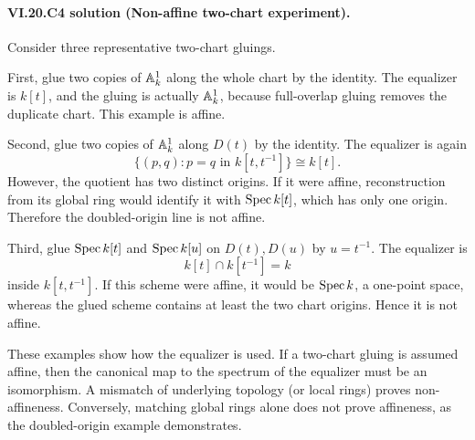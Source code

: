 \paragraph{VI.20.C4 solution (Non-affine two-chart experiment).}
\begin{solution}
Consider three representative two-chart gluings.

First, glue two copies of $\mathbb A^1_k$ along the whole chart by the identity.  The equalizer is $k[t]$, and the gluing is actually $\mathbb A^1_k$, because full-overlap gluing removes the duplicate chart.  This example is affine.

Second, glue two copies of $\mathbb A^1_k$ along $D(t)$ by the identity.  The equalizer is again
\[
\{(p,q):p=q\text{ in }k[t,t^{-1}]\}\cong k[t].
\]
However, the quotient has two distinct origins.  If it were affine, reconstruction from its global ring would identify it with $\operatorname{Spec} k[t]$, which has only one origin.  Therefore the doubled-origin line is not affine.

Third, glue $\operatorname{Spec} k[t]$ and $\operatorname{Spec} k[u]$ on $D(t),D(u)$ by $u=t^{-1}$.  The equalizer is
\[
k[t]\cap k[t^{-1}]=k
\]
inside $k[t,t^{-1}]$.  If this scheme were affine, it would be $\operatorname{Spec} k$, a one-point space, whereas the glued scheme contains at least the two chart origins.  Hence it is not affine.

These examples show how the equalizer is used.  If a two-chart gluing is assumed affine, then the canonical map to the spectrum of the equalizer must be an isomorphism.  A mismatch of underlying topology (or local rings) proves non-affineness.  Conversely, matching global rings alone does not prove affineness, as the doubled-origin example demonstrates.
\end{solution}

